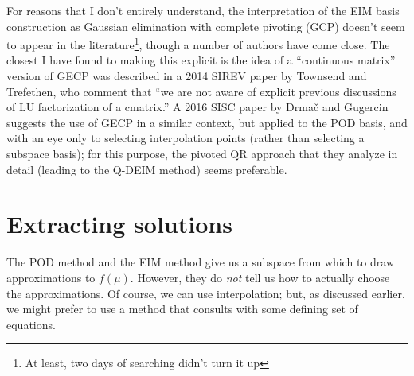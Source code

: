 \documentclass[12pt, leqno]{article} %
\begin{document}
For reasons that I don't entirely understand, the interpretation of
the EIM basis construction as Gaussian elimination with complete
pivoting (GCP) doesn't seem to appear in the literature\footnote{At
least, two days of searching didn't turn it up}, though a number of
authors have come close.  The closest I have found to making this
explicit is the idea of a ``continuous matrix'' version of GECP was
described in a 2014 SIREV paper by Townsend and Trefethen, who comment
that ``we are not aware of explicit previous discussions of LU
factorization of a cmatrix.''  A 2016 SISC paper by Drma\v{c} and
Gugercin suggests the use of GECP in a similar context, but applied to
the POD basis, and with an eye only to selecting interpolation points
(rather than selecting a subspace basis); for this purpose, the
pivoted QR approach that they analyze in detail (leading to the Q-DEIM
method) seems preferable.

\section{Extracting solutions}

The POD method and the EIM method give us a subspace from which to
draw approximations to $f(\mu)$.  However, they do {\em not} tell
us how to actually choose the approximations.  Of course, we can use
interpolation; but, as discussed earlier, we might prefer to use a
method that consults with some defining set of equations.
\end{document}
